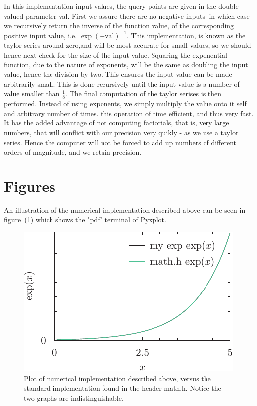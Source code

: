 \documentclass[twocolumn]{article}
\begin{document}
In this implementation input values, the query points are given in the double valued parameter val.
First we assure there are no negative inputs, in which case we recursively return the inverse of the function value, of the corresponding positive input value, i.e. $\exp \left( -\text{val} \right)^{-1}$. This implementation, is known as the taylor series around zero,and will be most accurate for small values, so we should hence next check for the size of the input value. 
Squaring the exponential function, due to the nature of exponents, will be the same as doubling the input value, hence the division by two. This ensures the input value can be made arbitrarily small. 
This is done recursively until the input value is a number of value smaller than $\frac18$. 
The final computation of the taylor serises is then performed. Instead of using exponents, we simply multiply the value onto it self and arbitrary number of times. this operation of time efficient, and thus very fast. It has the added advantage of not computing factorials, that is, very large numbers, that will conflict
with our precision very quikly - as we use a taylor series. Hence the computer will not be forced to add up numbers of different orders of magnitude, and we retain precision.

\section{Figures}
An illustration of the numerical implementation described above can be seen in figure~(\ref{fig:pyxplot}) which 
shows the "pdf" terminal of Pyxplot.


\begin{figure}[h]
	\includegraphics{exp_plot.pdf}
	\caption{ Plot of numerical implementation described above, versus the standard implementation found in the header math.h. Notice the two graphs are indistinguishable.}
	\label{fig:pyxplot}
\end{figure}
\end{document}

